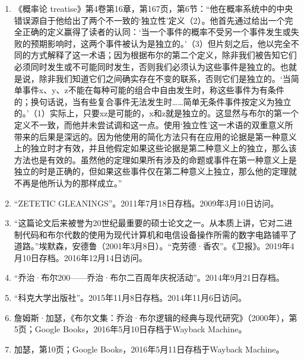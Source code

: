 \begin{enumerate}
\item 《概率论 treatise》第4卷第16章，第167页，第6节：“他在概率系统中的中央错误源自于他给出了两个不一致的‘独立性’定义（2）。他首先通过给出一个完全正确的定义赢得了读者的认同：‘当一个事件的概率不受另一个事件发生或失败的预期影响时，这两个事件被认为是独立的。’（3）但片刻之后，他以完全不同的方式解释了这一术语；因为根据布尔的第二个定义，除非我们被告知它们必须同时发生或不可能同时发生，否则我们必须认为这些事件是独立的。也就是说，除非我们知道它们之间确实存在不变的联系，否则它们是独立的。‘当简单事件x、y、z不能在每种可能的组合中自由发生时，称这些事件为有条件的；换句话说，当有些复合事件无法发生时……简单无条件事件按定义为独立的。’（1）实际上，只要xz是可能的，x和z就是独立的。这显然与布尔的第一个定义不一致，而他并未尝试调和这一点。使用‘独立性’这一术语的双重意义所带来的后果是深远的。因为他使用的简化方法只有在应用的论据是第一种意义上的独立时才有效，并且他假定如果这些论据是第二种意义上的独立，那么该方法也是有效的。虽然他的定理如果所有涉及的命题或事件在第一种意义上是独立的时是正确的，但如果这些事件仅在第二种意义上独立，那么他的定理就不再是他所认为的那样成立。”
\item “ZETETIC GLEANINGS”。2011年7月18日存档。2009年3月10日访问。
\item “这篇论文后来被誉为20世纪最重要的硕士论文之一。从本质上讲，它对二进制代码和布尔代数的使用为现代计算机和电信设备操作所需的数字电路铺平了道路。”埃默森，安德鲁（2001年3月8日）。“克劳德·香农”。《卫报》。2019年4月10日存档。2016年12月14日访问。
\item “乔治·布尔200——乔治·布尔二百周年庆祝活动”。2014年9月21日存档。
\item “科克大学出版社”。2015年11月8日存档。2014年11月6日访问。
\item 詹姆斯·加瑟，《布尔文集：乔治·布尔逻辑的经典与现代研究》（2000年），第5页；Google Books，2016年5月10日存档于Wayback Machine。
\item 加瑟，第10页；Google Books，2016年5月11日存档于Wayback Machine。
\end{enumerate}